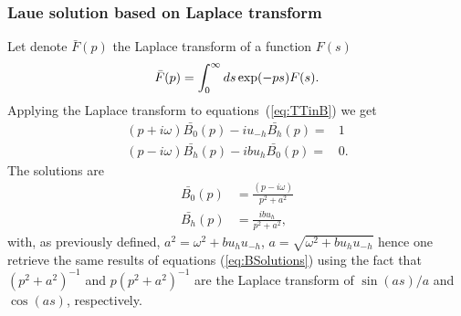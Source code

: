 \documentclass[preprint]{iucr}              %
\begin{document}
\subsubsection{Laue solution based on Laplace transform}
\label{sec:laplaceLaue}
Let denote $\bar{F}(p)$ the Laplace transform of a function $F(s)$
\begin{equation}
\Bar{F}(p) = \int_0^\infty ds \exp(-p s) F(s). \nonumber
\end{equation}
Applying the Laplace transform to equations~(\ref{eq:TTinB}) we get
\begin{subequations}
\label{eq:TTlaueLaplace}
\begin{align}
(p + i \omega) \bar{B_0}(p) - i u_{-h} \bar{B_h}(p)= & 1 \nonumber \\
(p - i \omega) \bar{B_h}(p) - i b u_{h} \bar{B_0}(p)= & 0. \nonumber
\end{align}
\end{subequations}
The solutions are
\begin{subequations}
\begin{align}
\bar{B_0}(p) &= \frac{(p - i \omega) }{p^2 + a^2} \nonumber \\
\bar{B_h}(p) &= \frac{i b u_h}{p^2 + a^2}, \nonumber
\end{align}
\end{subequations}
with, as previously defined, $a^2=\omega^2 + b u_h u_{-h}$, $a=\sqrt{\omega^2+b u_h u_{-h}}$
hence one retrieve the same results of equations (\ref{eq:BSolutions}) using the fact that  $(p^2+a^2)^{-1}$ and $p(p^2+a^2)^{-1}$ are the Laplace transform of $\sin(a s)/a$ and $\cos(a s)$, respectively. 
\end{document}

